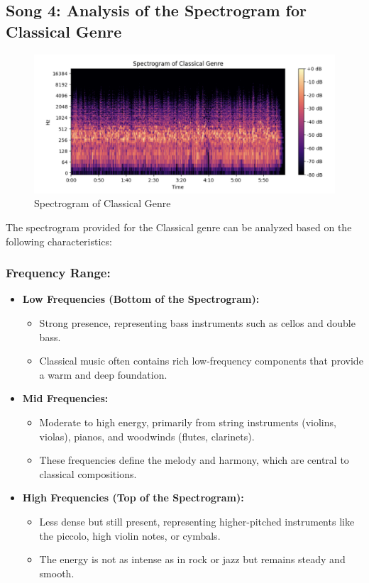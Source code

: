 \documentclass[a4paper,12pt]{article}
\begin{document}
\subsection{Song 4: Analysis of the Spectrogram for Classical Genre}
\begin{figure}[H]
    \centering
    \includegraphics[width=1\linewidth]{3.png}
    \caption{Spectrogram of Classical Genre}
\end{figure}
The spectrogram provided for the Classical genre can be analyzed based on the following characteristics:
\subsubsection{Frequency Range:}
\begin{itemize}
    \item \textbf{Low Frequencies (Bottom of the Spectrogram):}
    \begin{itemize}
        \item Strong presence, representing bass instruments such as cellos and double bass.
        \item Classical music often contains rich low-frequency components that provide a warm and deep foundation.
        \end{itemize}
    \item \textbf{Mid Frequencies:} 
        \begin{itemize}
        \item Moderate to high energy, primarily from string instruments (violins, violas), pianos, and woodwinds (flutes, clarinets).
        \item These frequencies define the melody and harmony, which are central to classical compositions.
        \end{itemize}
    \item \textbf{High Frequencies (Top of the Spectrogram):}
        \begin{itemize}
        \item Less dense but still present, representing higher-pitched instruments like the piccolo, high violin notes, or cymbals.
        \item The energy is not as intense as in rock or jazz but remains steady and smooth.
        \end{itemize}
\end{itemize}
\end{document}
